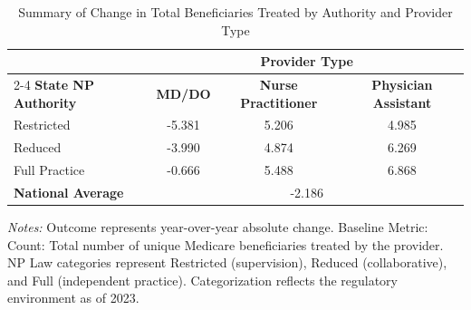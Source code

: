 \begin{table}[htbp]
    \centering
    \caption{Summary of Change in Total Beneficiaries Treated by Authority and Provider Type}
    \label{tab:d_tot_benes_provtype}
    \vspace{0.2cm}
    \begin{tabular}{lccc}
        \toprule
        & \multicolumn{3}{c}{\textbf{Provider Type}} \\
        \cmidrule(lr){2-4}
        \textbf{State NP Authority} & \textbf{MD/DO} & \textbf{Nurse Practitioner} & \textbf{Physician Assistant} \\
        \midrule
        Restricted & -5.381 & 5.206 & 4.985 \\
        Reduced & -3.990 & 4.874 & 6.269 \\
        Full Practice & -0.666 & 5.488 & 6.868 \\
        \midrule
        \textbf{National Average} & \multicolumn{3}{c}{-2.186} \\
        \bottomrule
    \end{tabular}
    \vspace{0.1cm}
    \begin{minipage}{0.85\textwidth}
        \footnotesize \textit{Notes:} Outcome represents year-over-year absolute change. Baseline Metric: Count: Total number of unique Medicare beneficiaries treated by the provider. NP Law categories represent Restricted (supervision), Reduced (collaborative), and Full (independent practice). Categorization reflects the regulatory environment as of 2023.
    \end{minipage}
\end{table}